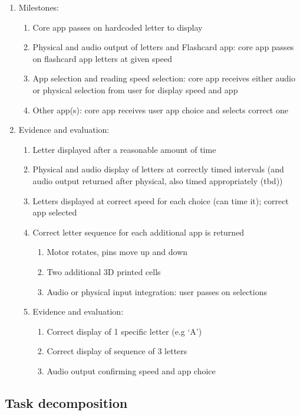 \documentclass{article}
\begin{document}
\begin{enumerate}
  \item Milestones:
  \begin{enumerate}
    \item Core app passes on hardcoded letter to display
    \item Physical and audio output of letters and Flashcard app: core app passes on flashcard app letters at given speed
    \item App selection and reading speed selection: core app receives either audio or physical selection from user for display speed and app
    \item Other app(s): core app receives user app choice and selects correct one
  \end{enumerate}
  \item Evidence and evaluation:
  \begin{enumerate}
    \item Letter displayed after a reasonable amount of time
    \item Physical and audio display of letters at correctly timed intervals (and audio output returned after physical, also timed appropriately (tbd))
    \item Letters displayed at correct speed for each choice (can time it); correct app selected
    \item Correct letter sequence for each additional app is returned
    \begin{enumerate}
      \item Motor rotates, pins move up and down
      \item Two additional 3D printed cells
      \item Audio or physical input integration: user passes on selections
    \end{enumerate}
    \item Evidence and evaluation:
    \begin{enumerate}
      \item Correct display of 1 specific letter (e.g `A')
      \item Correct display of sequence of 3 letters
      \item Audio output confirming speed and app choice
    \end{enumerate}
  \end{enumerate}
\end{enumerate}


\subsection{Task decomposition}
\end{document}

